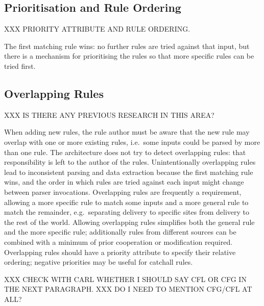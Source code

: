 \subsection{Prioritisation and Rule Ordering}

\label{prioritisation and rule ordering}

XXX PRIORITY ATTRIBUTE AND RULE ORDERING\@.

The first matching rule wins: no further rules are tried against that
input, but there is a mechanism for prioritising the rules so that more
specific rules can be tried first.

\subsection{Overlapping Rules}

\label{overlapping rules in architecture}

XXX IS THERE ANY PREVIOUS RESEARCH IN THIS AREA\@?

When adding new rules, the rule author must be aware that the new rule may
overlap with one or more existing rules, i.e.\ some inputs could be parsed
by more than one rule.  The architecture does not try to detect overlapping
rules: that responsibility is left to the author of the rules.
Unintentionally overlapping rules lead to inconsistent parsing and data
extraction because the first matching rule wins, and the order in which
rules are tried against each input might change between parser invocations.
Overlapping rules are frequently a requirement, allowing a more specific
rule to match some inputs and a more general rule to match the remainder,
e.g.\ separating  delivery to specific sites from
 delivery to the rest of the world.  Allowing overlapping
rules simplifies both the general rule and the more specific rule;
additionally rules from different sources can be combined with a minimum of
prior cooperation or modification required.  Overlapping rules should have
a priority attribute to specify their relative ordering; negative
priorities may be useful for catchall rules.

XXX CHECK WITH CARL WHETHER I SHOULD SAY CFL OR CFG IN THE NEXT
PARAGRAPH\@.  XXX DO I NEED TO MENTION CFG/CFL AT ALL\@?

